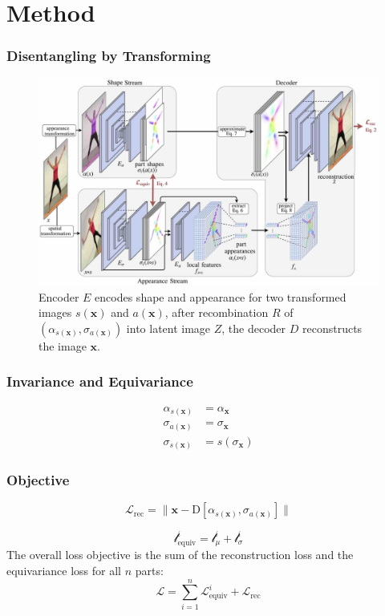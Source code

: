 \section{Method}
	\begin{frame}
	\frametitle{Disentangling by Transforming}
		\begin{figure}[t]
			\centering
			\includegraphics[trim={0cm 0cm 0cm 0cm},clip, width=1.\linewidth]{fig/other/architecture_final}
			\caption{Encoder $E$ encodes shape and appearance for two transformed images $s(\mathbf{x})$ and $a(\mathbf{x})$, after recombination $R$ of $({\alpha}_{s(\mathbf{x})}, {\sigma}_{a(\mathbf{x})})$ into latent image $Z$, the decoder $D$ reconstructs the image $\mathbf{x}$.}
			\label{fig:architecture}
		\end{figure}
	\end{frame}

	\begin{frame}
	\frametitle{Invariance and Equivariance}
		\begin{align}
			{\alpha}_{s(\mathbf{x})}  &= {\alpha}_{\mathbf{x}} \tag{invariance of appearance}\\
			{\sigma}_{a(\mathbf{x})} &= {\sigma}_{\mathbf{x}}  \tag{invariance of shape}\\
			{\sigma}_{s(\mathbf{x})} &= s({\sigma}_{\mathbf{x}}) \tag{equivariance of shape}
		\label{eq:invar}
		\end{align} %
	\end{frame}

	\begin{frame}
	\frametitle{Objective}
		\begin{equation}\label{eq:loss_rec}
			\mathcal{L}_{\textrm{rec}}= \lVert  \mathbf{x}  - \mathrm{D}[{\alpha}_{s(\mathbf{x})}, {\sigma}_{a(\mathbf{x})}]\rVert
		\end{equation}

		\begin{equation}
			\mathcal{l}_{\textrm{equiv}}^i = \mathcal{l}_{\mu}^i+ \mathcal{l}_{\sigma}^i
		\label{covariance}
		\end{equation}
		The overall loss objective is the sum of the reconstruction loss and the equivariance loss for all $n$ parts:
		\begin{equation}
		\mathcal{L} = \sum_{i=1}^n \mathcal{L}_{\text{equiv}}^i + \mathcal{L}_{\textrm{rec}}
		\end{equation}
	\end{frame}




